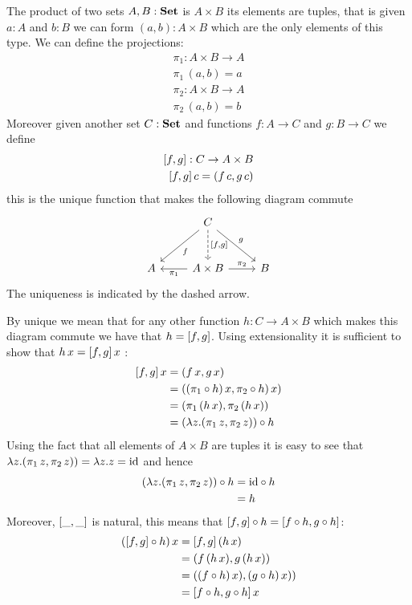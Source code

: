 The product of two sets $A,B : \mathbf{Set}$ is $A\times B$ its elements are tuples, that is given $a:A$ and $b:B$ we can form $(a,b) : A \times B$ which are the only elements of this type. We can define the projections:
\begin{align*}
\pi_1 : A \times B \to A \\
\pi_1\,(a,b) = a \\
\pi_2 : A \times B \to A \\
\pi_2\,(a,b) = b
\end{align*}
Moreover given another set $C:\mathbf{Set}$ and functions $f : A \to C$ and $g : B \to C$ we define
\begin{align*}
\pair{f}{g} : C \to A \times B \\
\pair{f}{g}\,c = (f\,c,g\,c)
\end{align*}
this is the unique function that makes the following diagram commute 
\[\begin{tikzcd}[row sep = large]
& C \arrow[dl,"f"] \arrow[d, dashrightarrow,"\pair{f}{g}"] \arrow[dr,"g"]\\
A & A \times B \arrow[r,"\pi_2"] \arrow[l,"\pi_1"]& B
\end{tikzcd}\]
The uniqueness is indicated by the dashed arrow. 

By unique we mean that for any other function $h : C \to A \times B$ which makes this diagram commute we have that $h = [f,g]$. Using extensionality it is sufficient to show that $h\,x = [f,g]\,x$ :
\begin{align*}
[f,g]\,x
& = (f\,x,g\,x) \\
& = ((\pi_1 \circ h)\,x, \pi_2 \circ h)\,x)\\
& = (\pi_1 \,( h\,x), \pi_2\,(h\,x))\\
& = (\lambda z.(\pi_1\,z,\pi_2\,z))\circ h\\
\end{align*}
Using the fact that all elements of $A \times B$ are tuples it is easy to see that $\lambda z.(\pi_1\,z,\pi_2\,z)) = \lambda z.z = \mathrm{id}$ and hence
\begin{align*}
(\lambda z.(\pi_1\,z,\pi_2\,z))\circ h
& = \mathrm{id} \circ h \\
& = h
\end{align*}
Moreover, $[\_,\_]$ is natural, this means that $[f,g] \circ h = [f \circ h,g \circ h]$:
\begin{align*}
([f,g] \circ h)\,x
& = [f,g]\,(h\,x) \\
& = (f\,(h\,x),g\,(h\,x)) \\
& = ((f\circ h)\,x),(g\circ h)\,x)) \\
& = [f \circ h,g \circ h]\,x
\end{align*}

